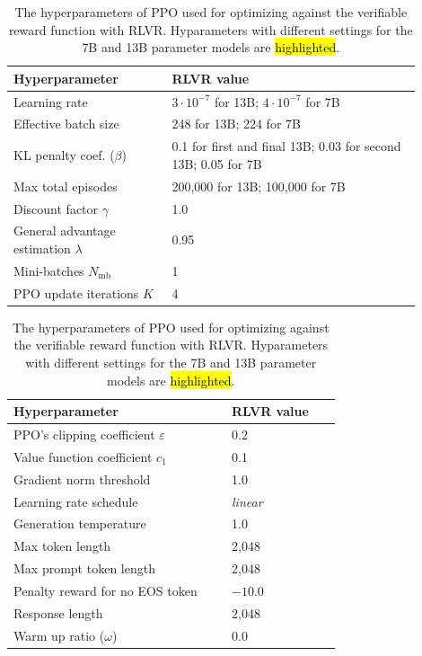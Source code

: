 \documentclass[table]{ai2style/ai2}
\begin{document}
\begin{table}[h]
\centering
\begin{minipage}{0.48\textwidth}
    \footnotesize
    \centering
    \setlength\tabcolsep{3pt}
    \begin{tabular}{>{\raggedright}p{0.35\linewidth}p{0.55\linewidth}}
        \toprule
        \textbf{Hyperparameter} & \textbf{RLVR value}  \\
        \midrule
        \rowcolor{ai2offwhite} Learning rate & $3 \cdot 10^{-7}$ for 13B; $4 \cdot 10^{-7}$ for 7B \\
        \rowcolor{ai2offwhite} Effective batch size & 248 for 13B; 224 for 7B \\
        \rowcolor{ai2offwhite} 
        KL penalty coef.  ($\beta$) &
        {0.1 for first and final 13B; 0.03 for second 13B; 0.05 for 7B} \\
        \rowcolor{ai2offwhite} Max total episodes & 200,000 for 13B; 100,000 for 7B \\
        Discount factor $\gamma$ & 1.0 \\
        General advantage estimation $\lambda$ & 0.95 \\
        Mini-batches $N_\text{mb}$ & 1 \\
        PPO update iterations $K$ & 4 \\
        \bottomrule
    \end{tabular}
\end{minipage}
\hfill
\begin{minipage}{0.48\textwidth}
    \footnotesize
    \centering
    \setlength\tabcolsep{3pt}
    \begin{tabular}{>{\raggedright}p{0.60\linewidth}p{0.3\linewidth}}
        \toprule
        \textbf{Hyperparameter} & \textbf{RLVR value}  \\
        \midrule
        PPO's clipping coefficient $\varepsilon$  & 0.2 \\
        Value function coefficient $c_1$ & 0.1 \\
        Gradient norm threshold & 1.0 \\
        Learning rate schedule & \textit{linear} \\
        Generation temperature & 1.0 \\
        Max token length & 2,048 \\
        Max prompt token length & 2,048 \\
        {Penalty reward for no EOS token} & $-10.0$ \\
        Response length & 2,048 \\
        Warm up ratio ($\omega$) & 0.0 \\
        \bottomrule
    \end{tabular}
\end{minipage}
\caption{The hyperparameters of PPO used for optimizing against the verifiable reward function with RLVR.
Hyparameters with different settings for the 7B and 13B parameter models are \hl{highlighted}.}
\label{tab:hypers_rlvr}
\end{table}
\end{document}

